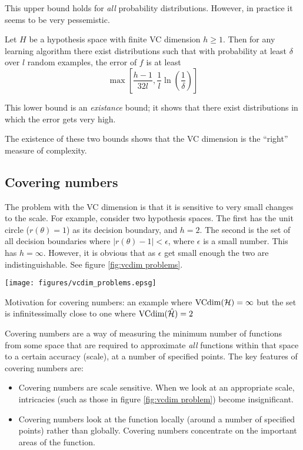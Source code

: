 This upper bound holds for \emph{all} probability distributions.
However, in practice it seems to be very pessemistic.

\begin{theorem}
Let $H$ be a hypothesis space with finite VC dimension $h \geq 1$.
Then for any learning algorithm there exist distributions such that
with probability at least $\delta$ over $l$ random examples, the error
of $f$ is at least
\begin{equation}
\max \left[ \frac{h-1}{32l}, \frac{1}{l} \ln \left( \frac{1}{\delta}
\right) \right]
\end{equation}
\end{theorem}

This lower bound is an \emph{existance} bound; it shows that there
exist distributions in which the error gets very high.

The existence of these two bounds shows that the VC dimension is the
``right'' measure of complexity.  



\subsection{Covering numbers}

The problem with the VC dimension is that it is sensitive to very
small changes to the scale.  For example, consider two hypothesis
spaces.  The first has the unit circle ($r(\theta) = 1$) as its decision
boundary, and $h = 2$.  The second is the set of all decision
boundaries where $|r(\theta) - 1| < \epsilon$, where $\epsilon$ is a
small number.  This has $h = \infty$.  However, it is obvious that as
$\epsilon$ get small enough the two are indistinguishable.  See figure
\ref{fig:vcdim problems}.

\begin{linefigure}
\begin{center}
\texttt{[image: figures/vcdim\_problems.epsg]}
\end{center}
\caption{Motivation for covering numbers: an example where
$\mathrm{VCdim}(\mathcal{H}) = \infty$ but the set is infinitessimally close to one where
$\mathrm{VCdim}(\hat{\mathcal{H}}) = 2$}
\label{fig:vcdim problems}
\end{linefigure}

Covering numbers are a way of measuring the minimum number of
functions from some space that are required to approximate \emph{all}
functions within that space to a certain accuracy (scale), at a number
of specified points.  The key features of covering numbers are:
%
\begin{itemize}
\item	Covering numbers are scale sensitive.  When we look at an
	appropriate scale, intricacies (such as those in figure
	\ref{fig:vcdim problem}) become insignificant.
\item	Covering numbers look at the function locally (around a number
	of specified points) rather than globally.  Covering
	numbers concentrate on the important areas of the function.
\end{itemize}

